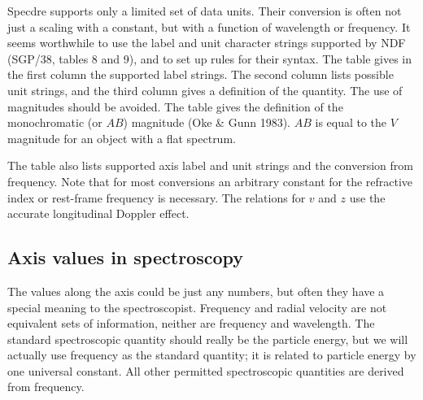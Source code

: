 Specdre supports only a limited set of data units. Their conversion is often
not just a scaling with a constant, but with a function of wavelength or
frequency. It seems worthwhile to use the label and unit character strings
supported by NDF (SGP/38, tables 8 and 9), and to set up rules for their
syntax. The table gives in the first column the supported label
strings. The second column lists possible unit strings, and the third column
gives a definition of the quantity. The use of magnitudes should be avoided.
The table gives the definition of the monochromatic (or $AB$) magnitude (Oke \&
Gunn 1983). $AB$ is equal to the $V$ magnitude for an object with a flat
spectrum.

The table also lists supported axis label and unit strings and the conversion
from frequency. Note that for most conversions an arbitrary constant for the
refractive index or rest-frame frequency is necessary. The relations for $v$
and $z$ use the accurate longitudinal Doppler effect.


\subsection{Axis values in spectroscopy}

The values along the axis could be just any numbers, but often they have a
special meaning to the spectroscopist. Frequency and radial velocity are not
equivalent sets of information, neither are frequency and wavelength. The
standard spectroscopic quantity should really
be the particle energy, but we will
actually use frequency as the standard quantity; it is related to particle
energy by one universal constant. All other permitted spectroscopic quantities
are derived from frequency.

